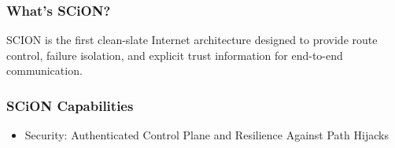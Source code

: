 \documentclass[aspectratio=169]{beamer}
\begin{document}
\begin{frame}
  \frametitle{What's SCiON?}
  SCION is the first clean-slate Internet architecture designed to provide route control, failure isolation, and explicit trust information for end-to-end communication.
\end{frame}

\begin{frame}
\frametitle{SCiON Capabilities}
  \begin{itemize}[<alert@+>]
    \item Security: Authenticated Control Plane and Resilience Against Path Hijacks
    \note[item]{}
  \end{itemize}
\end{frame}
\end{document}
